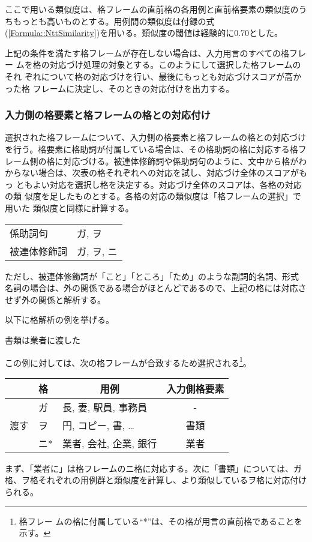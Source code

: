 \documentclass[fleqn]{nlp}
\newcommand{\sm}[1]{}
\begin{document}
\noindent
ここで用いる類似度は、格フレームの直前格の各用例と直前格要素の類似度のう
ちもっとも高いものとする。用例間の類似度は付録の式
(\ref{Formula::NttSimilarity})を用いる。類似度の閾値は経験的に0.70とした。

上記の条件を満たす格フレームが存在しない場合は、入力用言のすべての格フレー
ムを格の対応づけ処理の対象とする。このようにして選択した格フレームのそれ
ぞれについて格の対応づけを行い、最後にもっとも対応づけスコアが高かった格
フレームに決定し、そのときの対応付けを出力する。


\subsubsection{入力側の格要素と格フレームの格との対応付け}

選択された格フレームについて、入力側の格要素と格フレームの格との対応づけ
を行う。格要素に格助詞が付属している場合は、その格助詞の格に対応する格フ
レーム側の格に対応づける。被連体修飾詞や係助詞句のように、文中から格がわ
からない場合は、次表の格それぞれへの対応を試し、対応づけ全体のスコアがもっ
ともよい対応を選択し格を決定する。対応づけ全体のスコアは、各格の対応の類
似度を足したものとする。各格の対応の類似度は「格フレームの選択」で用いた
類似度と同様に計算する。
\begin{center}
 \begin{tabular}{l@{ : }l} \hline
  係助詞句 & ガ, ヲ \\
  被連体修飾詞 & ガ, ヲ, ニ \\ \hline
 \end{tabular}
\end{center}
ただし、被連体修飾詞が「こと」「ところ」「ため」のような副詞的名詞、形式
名詞の場合は、外の関係である場合がほとんどであるので、上記の格には対応さ
せず外の関係と解析する。

以下に格解析の例を挙げる。

\begin{exe}
 \ex 書類は業者に渡した
\end{exe}
この例に対しては、次の格フレームが合致するため選択される\footnote{格フレー
ムの格に付属している``*''は、その格が用言の直前格であることを示す。}。
\begin{center}
 \begin{tabular}{l|l|l||c} \hline
                         & 格   & \multicolumn{1}{c||}{用例} & 入力側格要素 \\ \hline
 \multirow{3}{2zw}{渡す} & ガ   & 長, 妻, 駅員, 事務員 & - \\
                         & ヲ   & \sm{数量}円, コピー, 書, … & 書類 \\
                         & ニ*  & 業者, 会社, 企業, 銀行 & 業者 \\ \hline
 \end{tabular}
\end{center}
まず、「業者に」は格フレームのニ格に対応する。次に「書類」については、ガ
格、ヲ格それぞれの用例群と類似度を計算し、より類似しているヲ格に対応付け
られる。
\end{document}

